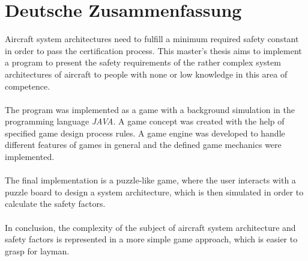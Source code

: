 \section*{Deutsche Zusammenfassung}
Aircraft system architectures need to fulfill a minimum required safety constant in order to pass the certification process.
This master’s thesis aims to implement a program to present the safety requirements of the rather complex system architectures
of aircraft to people with none or low knowledge in this area of competence.
\\ \\
The program was implemented as a game with a background simulation in the programming language \textit{JAVA}.
A game concept was created with the help of specified game design process rules.
A game engine was developed to handle different features of games in general and the defined game mechanics were implemented.
\\ \\
The final implementation is a puzzle-like game, where the user interacts with a puzzle board to design a system architecture,
which is then simulated in order to calculate the safety factors.
\\ \\
In conclusion, the complexity of the subject of aircraft system architecture and safety factors is represented in a more simple
game approach, which is easier to grasp for layman.
